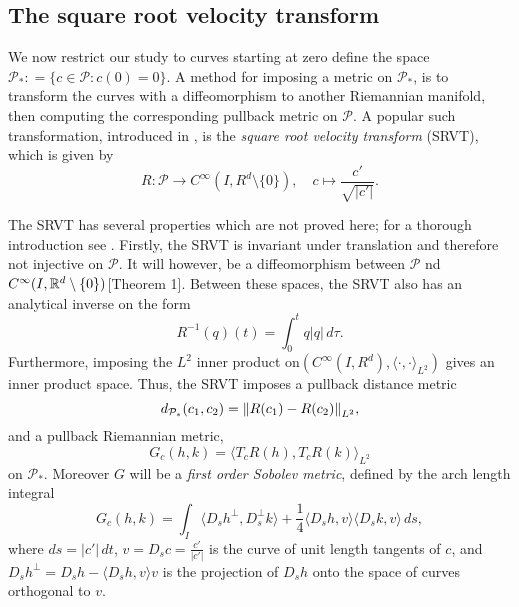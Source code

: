 \subsection{The square root velocity transform}
We now restrict our study to curves starting at zero define the space \(\mathcal{P}_* : = \{c \in \mathcal{P}: c(0) = 0\}\). A method for imposing a metric on \(\mathcal{P}_*\), is to transform the curves with a diffeomorphism to another Riemannian manifold, then computing the corresponding pullback metric on \(\mathcal{P}\). A popular such transformation, introduced in \cite{srivastava2011_srvt}, is the \emph{square root velocity transform} (SRVT), which is given by
\begin{equation}\label{eq:SRVT}
  R :\mathcal{P} \rightarrow C^{\infty}(I, R^d \setminus \{0\}), \quad c \mapsto \frac{c'}{\sqrt{\vert c' \vert}}.
\end{equation}

The SRVT has several properties which are not proved here; for a thorough introduction see \cite{bruveris1016_srvtexample,bauer2014_rprop}. Firstly, the SRVT is invariant under translation and therefore not injective on \(\mathcal{P}\). It will however, be a diffeomorphism between \(\mathcal{P}\) nd \(C^{\infty}(I, \mathbb{R}^d \setminus \{0\})\)\cite{bruveris1016_srvtexample}[Theorem 1]. Between these spaces, the SRVT also has an analytical inverse on the form
\begin{equation*}
  R^{-1}(q)(t) = \int_0 ^t q \vert q\vert \,d\tau.
\end{equation*}
Furthermore, imposing the \(L^2\) inner product on\((C^{\infty}(I, R^d), \langle \cdot , \cdot \rangle_{L^2} )\) gives an inner product space. Thus, the SRVT imposes a pullback distance metric  
\begin{equation*}
  d_{\mathcal{P}_*}(c_1, c_2) = \norm{R(c_1) - R(c_2)}_{L^2}, 
\end{equation*}
and a pullback Riemannian metric, 
\begin{equation*}
  G_c(h,k) = \langle T_c R(h), T_c R(k) \rangle_{L^2}
\end{equation*}
 on \(\mathcal{P}_*\). Moreover \(G\) will be a \emph{first order Sobolev metric}, defined by the arch length integral
\begin{equation*}
  G_c(h,k) = \int_I \langle D_s h^\perp ,D_s^\perp k \rangle+\frac{1}{4}\langle D_s h,v\rangle \langle D_s k,v\rangle \,ds,
\end{equation*}
where \(ds = \vert c' \vert\,dt\), \(v = D_s c = \frac{c'}{\vert c'\vert}\) is the curve of unit length tangents of \(c\), and \(D_s h^\perp = D_s h  - \langle D_s h,v\rangle v\) is the projection of \(D_s h\) onto the space of curves orthogonal to \(v\). 

